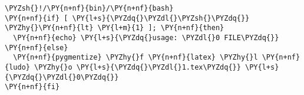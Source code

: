 \begin{Verbatim}[commandchars=\\\{\}]
\PYZsh{}!/\PY{n+nf}{bin}/\PY{n+nf}{bash}
\PY{n+nf}{if} [ \PY{l+s}{\PYZdq{}\PYZdl{}\PYZsh{}\PYZdq{}} \PYZhy{}\PY{n+nf}{lt} \PY{l+m}{1} ]; \PY{n+nf}{then}
  \PY{n+nf}{echo} \PY{l+s}{\PYZdq{}usage: \PYZdl{}0 FILE\PYZdq{}}
\PY{n+nf}{else}
  \PY{n+nf}{pygmentize} \PYZhy{}f \PY{n+nf}{latex} \PYZhy{}l \PY{n+nf}{ludo} \PYZhy{}o \PY{l+s}{\PYZdq{}\PYZdl{}1.tex\PYZdq{}} \PY{l+s}{\PYZdq{}\PYZdl{}0\PYZdq{}}
\PY{n+nf}{fi}
\end{Verbatim}
